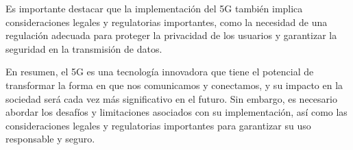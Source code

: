 \documentclass[12pt]{article}
\begin{document}
        Es importante destacar que la implementación del 5G también implica consideraciones legales y regulatorias importantes, como la necesidad de una regulación adecuada para proteger la privacidad de los usuarios y garantizar la seguridad en la transmisión de datos.
        
        En resumen, el 5G es una tecnología innovadora que tiene el potencial de transformar la forma en que nos comunicamos y conectamos, y su impacto en la sociedad será cada vez más significativo en el futuro. Sin embargo, es necesario abordar los desafíos y limitaciones asociados con su implementación, así como las consideraciones legales y regulatorias importantes para garantizar su uso responsable y seguro.

    
    
    
\end{document}

